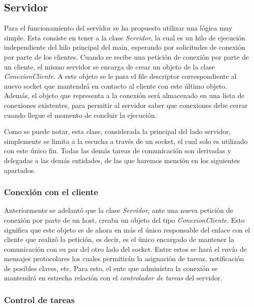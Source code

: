 \documentclass{article}
\begin{document}
\subsection{Servidor}

	Para el funcionamiento del servidor se ha propuesto utilizar una lógica muy simple. Esta consiste en tener a la clase \textit{Servidor}, la cual es un hilo de ejecución independiente del hilo principal del main, esperando por solicitudes de conexión por parte de los clientes. Cuando se recibe una petición de conexión por parte de un cliente, el mismo servidor se encarga de crear un objeto de la clase \textit{ConexionCliente}. A este objeto se le pasa el file descriptor correspondiente al nuevo socket que mantendrá en contacto al cliente con este último objeto. Además, el objeto que representa a la conexión será almacenado en una lista de conexiones existentes, para permitir al servidor saber que conexiones debe cerrar cuando llegue el momento de concluir la ejecución.
	\par
	Como se puede notar, esta clase, considerada la principal del lado servidor, simplemente se limita a la escucha a través de un socket, el cual solo es utilizado con este único fin. Todas las demás tareas de comunicación son derivadas y delegadas a las demás entidades, de las que haremos mención en los siguientes apartados.
	\bigskip\smallskip



\subsubsection{Conexión con el cliente}

	Anteriormente se adelantó que la clase \textit{Servidor}, ante una nueva petición de conexión por parte de un host, creaba un objeto del tipo \textit{ConexionCliente}. Esto significa que este objeto es de ahora en más el único responsable del enlace con el cliente que realizó la petición, es decir, es el único encargado de mantener la comunicación con su par del otro lado del socket. Entre estos se hará el envío de mensajes protocolares los cuales permitirán la asignación de tareas, notificación de posibles claves, etc. Para esto, el ente que administra la conexión se mantendrá en estrecha relación con el \textit{controlador de tareas} del servidor.
	\bigskip\smallskip



\subsubsection{Control de tareas}
\end{document}
